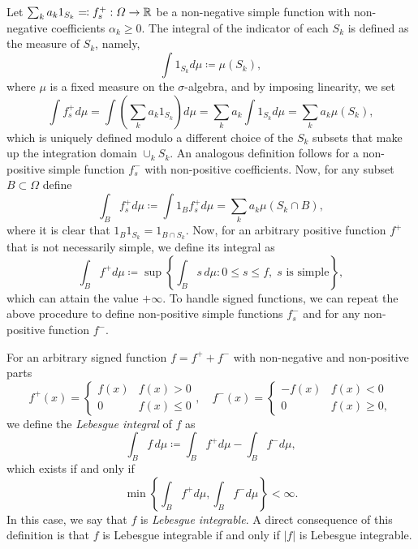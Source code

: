 \begin{definition}
    Let $\sum_k a_k 1_{S_k} \eqqcolon f_s^+:\Omega\to \mathbb{R}$ be a non-negative simple function with non-negative coefficients $\alpha_k\geq 0$. The integral of the indicator of each $S_k$ is defined as the measure of $S_k$, namely,
    \begin{equation*}
        \int 1_{S_k}d\mu \coloneqq \mu(S_k),
    \end{equation*}
    where $\mu$ is a fixed measure on the $\sigma$-algebra, and by imposing linearity, we set
    \begin{equation*}
        \int f_s^+ d\mu = \int \left(\sum_k a_k 1_{S_k}\right) d\mu = \sum_k a_k \int 1_{S_k} d\mu = \sum_k a_k \mu(S_k),
    \end{equation*}
    which is uniquely defined modulo a different choice of the $S_k$ subsets that make up the integration domain $\cup_k S_k$. An analogous definition follows for a non-positive simple function $f_s^-$ with non-positive coefficients. Now, for any subset $B\subset \Omega$ define 
    \begin{equation*}
        \int_B f_s^+ d\mu \coloneqq \int 1_B f_s^+ d\mu = \sum_k a_k \mu(S_k \cap B),
    \end{equation*}
    where it is clear that $1_B 1_{S_k} = 1_{B \cap S_k}$. Now, for an arbitrary positive function $f^+$ that is not necessarily simple, we define its integral as 
    \begin{equation*}
        \int_B f^+ d\mu \coloneqq \sup \left\{\int_B s\,d\mu: 0\leq s\leq f,\; s\text{ is simple}\right\},
    \end{equation*}
    which can attain the value $+\infty$. To handle signed functions, we can repeat the above procedure to define non-positive simple functions $f_s^-$ and for any non-positive function $f^-$.

    For an arbitrary signed function $f=f^+ + f^-$ with non-negative and non-positive parts 
    \begin{equation*}
        f^+(x) = \begin{cases}
            f(x)& f(x)>0\\
            0 & f(x)\leq 0
        \end{cases},\quad 
        f^-(x) = \begin{cases}
            -f(x)&f(x)<0\\
            0& f(x)\geq 0,
        \end{cases}
    \end{equation*}
    we define the \emph{Lebesgue integral} of $f$ as 
    \begin{equation*}
        \int_B f\,d\mu \coloneqq \int_B f^+ d\mu - \int_B f^-d\mu,
    \end{equation*}
    which exists if and only if
    \begin{equation*}
        \min\left\{\int_B f^+d\mu, \int_B f^- d\mu\right\}<\infty.
    \end{equation*}
    In this case, we say that $f$ is \emph{Lebesgue integrable}. A direct consequence of this definition is that $f$ is Lebesgue integrable if and only if $|f|$ is Lebesgue integrable.
\end{definition}
